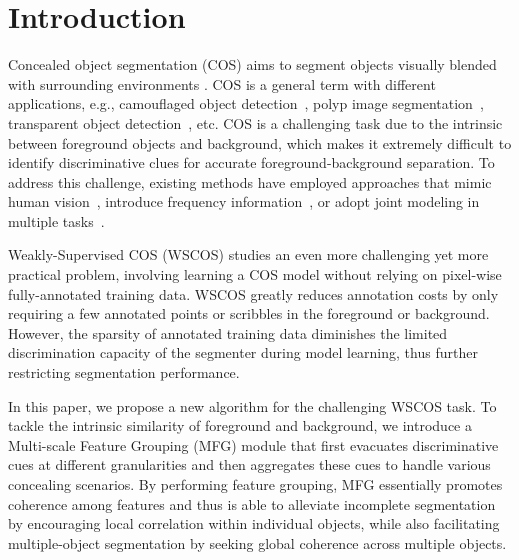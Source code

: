 \section{Introduction}
Concealed object segmentation (COS) aims to segment objects visually blended with surrounding environments \cite{fan2021concealed}. COS is a general term with different applications, e.g., camouflaged object detection~\cite{fan2020camouflaged,yang2021uncertainty}, polyp image segmentation~\cite{fan2020pranet,zhang2020adaptive}, transparent object detection~\cite{mei2020don,xie2020segmenting},  etc. 
COS is a challenging task due to the intrinsic between foreground objects and background, which makes it extremely difficult to identify discriminative clues for accurate foreground-background separation. To address this challenge, existing methods have employed approaches that mimic human vision~\cite{zhang2022preynet,mei2021camouflaged,pang2022zoom}, introduce frequency information~\cite{zhong2022detecting,He2023Camouflaged}, or adopt joint modeling in multiple tasks~\cite{zhai2021mutual,sun2022boundary,zhaiexploring,lv2021simultaneously,jia2022segment,zhu2022can}.

Weakly-Supervised COS (WSCOS) studies an even more challenging yet more  practical problem, involving learning a COS model without relying on pixel-wise fully-annotated training data. 
WSCOS greatly reduces annotation costs by only requiring a few annotated points or scribbles in the foreground or background. However, the sparsity of annotated training data diminishes the limited discrimination capacity of the segmenter during model learning, thus further restricting segmentation performance.

In this paper, we propose a new algorithm for the challenging WSCOS task. To tackle the intrinsic similarity of foreground and background, we introduce a Multi-scale Feature Grouping (MFG) module that first evacuates discriminative cues at different granularities and then aggregates these cues to handle various concealing scenarios. By performing feature grouping, MFG essentially promotes coherence among features and thus is able to alleviate incomplete segmentation by encouraging local correlation within individual objects, while also facilitating multiple-object segmentation by seeking global coherence across multiple objects.

